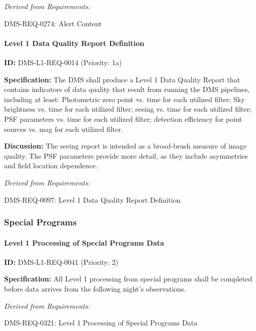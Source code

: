 \documentclass[SE,toc,lsstdraft]{lsstdoc}
\begin{document}
\emph{Derived from Requirements:}

DMS-REQ-0274:
Alert Content \newline

\paragraph{Level 1 Data Quality Report Definition}\hfill  %

\label{DMS-L1-REQ-0014}
\textbf{ID:} DMS-L1-REQ-0014 (Priority: 1a)

\textbf{Specification:} The DMS shall produce a Level 1 Data Quality Report that contains indicators of data quality that result from running the DMS pipelines, including at least: Photometric zero point vs. time for each utilized filter; Sky brightness vs. time for each utilized filter; seeing vs. time for each utilized filter; PSF parameters vs. time for each utilized filter; detection efficiency for point sources vs. mag for each utilized filter.

\textbf{Discussion:} The seeing report is intended as a broad-brush measure of image quality.  The PSF parameters provide more detail, as they include asymmetries and field location dependence.

\emph{Derived from Requirements:}

DMS-REQ-0097:
Level 1 Data Quality Report Definition \newline

\subsubsection{Special Programs}

\paragraph{Level 1 Processing of Special Programs Data}\hfill  %

\label{DMS-L1-REQ-0041}
\textbf{ID:} DMS-L1-REQ-0041 (Priority: 2)

\textbf{Specification:} All Level 1 processing from special programs shall be completed before data arrives from the following night's observations.

\emph{Derived from Requirements:}

DMS-REQ-0321:
Level 1 Processing of Special Programs Data \newline
\end{document}
